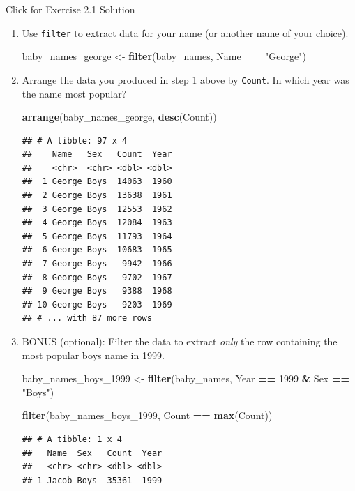 \documentclass[]{book}
\newenvironment{Shaded}{\begin{snugshade}}{\end{snugshade}}
\newcommand{\DecValTok}[1]{\textcolor[rgb]{0.00,0.00,0.81}{#1}}
\newcommand{\KeywordTok}[1]{\textcolor[rgb]{0.13,0.29,0.53}{\textbf{#1}}}
\newcommand{\NormalTok}[1]{#1}
\newcommand{\OperatorTok}[1]{\textcolor[rgb]{0.81,0.36,0.00}{\textbf{#1}}}
\newcommand{\StringTok}[1]{\textcolor[rgb]{0.31,0.60,0.02}{#1}}
\begin{document}
{Click for Exercise 2.1 Solution}

\begin{enumerate}
\def\labelenumi{\arabic{enumi}.}
\item
  Use \texttt{filter} to extract data for your name (or another name of your choice).

\begin{Shaded}
\begin{Highlighting}[]
\NormalTok{baby_names_george <-}\StringTok{ }\KeywordTok{filter}\NormalTok{(baby_names, Name }\OperatorTok{==}\StringTok{ "George"}\NormalTok{)}
\end{Highlighting}
\end{Shaded}
\item
  Arrange the data you produced in step 1 above by \texttt{Count}. In which year was the name most popular?

\begin{Shaded}
\begin{Highlighting}[]
\KeywordTok{arrange}\NormalTok{(baby_names_george, }\KeywordTok{desc}\NormalTok{(Count))}
\end{Highlighting}
\end{Shaded}

\begin{verbatim}
## # A tibble: 97 x 4
##    Name   Sex   Count  Year
##    <chr>  <chr> <dbl> <dbl>
##  1 George Boys  14063  1960
##  2 George Boys  13638  1961
##  3 George Boys  12553  1962
##  4 George Boys  12084  1963
##  5 George Boys  11793  1964
##  6 George Boys  10683  1965
##  7 George Boys   9942  1966
##  8 George Boys   9702  1967
##  9 George Boys   9388  1968
## 10 George Boys   9203  1969
## # ... with 87 more rows
\end{verbatim}
\item
  BONUS (optional): Filter the data to extract \emph{only} the row containing the most popular boys name in 1999.

\begin{Shaded}
\begin{Highlighting}[]
\NormalTok{baby_names_boys_}\DecValTok{1999}\NormalTok{ <-}\StringTok{ }\KeywordTok{filter}\NormalTok{(baby_names,}
\NormalTok{                               Year }\OperatorTok{==}\StringTok{ }\DecValTok{1999} \OperatorTok{&}\StringTok{ }\NormalTok{Sex }\OperatorTok{==}\StringTok{ "Boys"}\NormalTok{)}
\end{Highlighting}
\end{Shaded}

\begin{Shaded}
\begin{Highlighting}[]
\KeywordTok{filter}\NormalTok{(baby_names_boys_}\DecValTok{1999}\NormalTok{, Count }\OperatorTok{==}\StringTok{ }\KeywordTok{max}\NormalTok{(Count))}
\end{Highlighting}
\end{Shaded}

\begin{verbatim}
## # A tibble: 1 x 4
##   Name  Sex   Count  Year
##   <chr> <chr> <dbl> <dbl>
## 1 Jacob Boys  35361  1999
\end{verbatim}
\end{enumerate}
\end{document}
